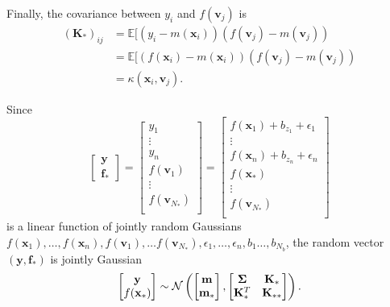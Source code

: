 Finally, the covariance between $y_i$ and $f(\mathbf{v}_j)$ is
\begin{align*}
    (\mathbf{K}_{*})_{ij}
    &= \mathbb{E}[ (y_i - m(\mathbf{x}_i))(f(\mathbf{v}_j) - m(\mathbf{v}_j)) \\
    &= \mathbb{E}[ (f(\mathbf{x}_i) - m(\mathbf{x}_i))(f(\mathbf{v}_j) - m(\mathbf{v}_j)) \\
    &= \kappa(\mathbf{x}_i, \mathbf{v}_j).
\end{align*}

Since
\begin{equation*}
    \begin{bmatrix}
        \mathbf{y} \\ \mathbf{f}_{*}
    \end{bmatrix}
    =
    \begin{bmatrix}
        y_1 \\
        \vdots \\
        y_n \\
        f(\mathbf{v}_1) \\
        \vdots \\
        f(\mathbf{v}_{N_{*}}) \\
    \end{bmatrix}
    =
    \begin{bmatrix}
        f(\mathbf{x}_1) + b_{z_1} + \epsilon_1 \\
        \vdots \\
        f(\mathbf{x}_n) + b_{z_n} + \epsilon_n \\
        f(\mathbf{x}_*) \\
        \vdots \\
        f(\mathbf{v}_{N_{*}}) \\
    \end{bmatrix}
\end{equation*}
is a linear function of jointly random Gaussians $f(\mathbf{x}_1), \ldots, f(\mathbf{x}_n), f(\mathbf{v}_1), \ldots f(\mathbf{v}_{N_*}), \epsilon_1, \ldots, \epsilon_n, b_1 \ldots, b_{N_b}$,
the random vector $(\mathbf{y}, \mathbf{f}_*)$ is jointly Gaussian
\begin{equation*}
    \begin{bmatrix}
        \mathbf{y} \\
        f(\mathbf{x}_*)
    \end{bmatrix}
    \sim
    \mathcal{N}\left(
    \begin{bmatrix}
            \mathbf{m} \\
            \mathbf{m}_*
        \end{bmatrix}
    ,
    \begin{bmatrix}
            \boldsymbol{\Sigma} & \mathbf{K}_* \\
            \mathbf{K}_*^T & \mathbf{K}_{* *}
        \end{bmatrix}
    \right).
\end{equation*}
